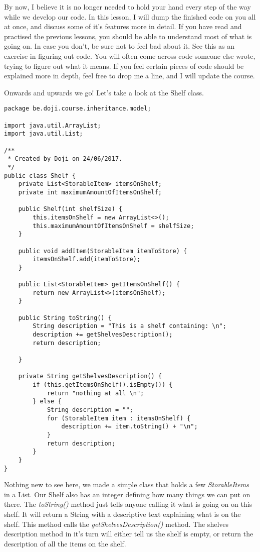 \documentclass[11pt,fleqn]{book} %
\begin{document}
\begin{remark}
	By now, I believe it is no longer needed to hold your hand every step of the way while we develop our code. In this lesson, I will dump the finished code on you all at once, and discuss 		some of it's features more in detail. If you have read and practised the previous lessons, you should be able to understand most of what is going on.
	In case you don't, be sure not to feel bad about it. See this as an exercise in figuring out code. You will often come across code someone else wrote, trying to figure out what it 			means. If you feel certain pieces of code should be explained more in depth, feel free to drop me a line, and I will update the course.	
\end{remark}

\pargraph{}Onwards and upwards we go! Let's take a look at the Shelf class.
\begin{lstlisting}[caption=Shelf.java]
package be.doji.course.inheritance.model;

import java.util.ArrayList;
import java.util.List;

/**
 * Created by Doji on 24/06/2017.
 */
public class Shelf {
    private List<StorableItem> itemsOnShelf;
    private int maximumAmountOfItemsOnShelf;

    public Shelf(int shelfSize) {
        this.itemsOnShelf = new ArrayList<>();
        this.maximumAmountOfItemsOnShelf = shelfSize;
    }

    public void addItem(StorableItem itemToStore) {
        itemsOnShelf.add(itemToStore);
    }

    public List<StorableItem> getItemsOnShelf() {
        return new ArrayList<>(itemsOnShelf);
    }

    public String toString() {
        String description = "This is a shelf containing: \n";
        description += getShelvesDescription();
        return description;

    }

    private String getShelvesDescription() {
        if (this.getItemsOnShelf().isEmpty()) {
            return "nothing at all \n";
        } else {
            String description = "";
            for (StorableItem item : itemsOnShelf) {
                description += item.toString() + "\n";
            }
            return description;
        }
    }
}
\end{lstlisting}
Nothing new to see here, we made a simple class that holds a few \emph{StorableItems} in a List. Our Shelf also has an integer defining how many things we can put on there.
The \emph{toString()} method just tells anyone calling it what is going on on this shelf. It will return a String with a descriptive text explaining what is on the shelf. This method calls the \emph{getShelvesDescription()} method. The shelves description method in it's turn will either tell us the shelf is empty, or return the description of all the items on the shelf.
\end{document}
